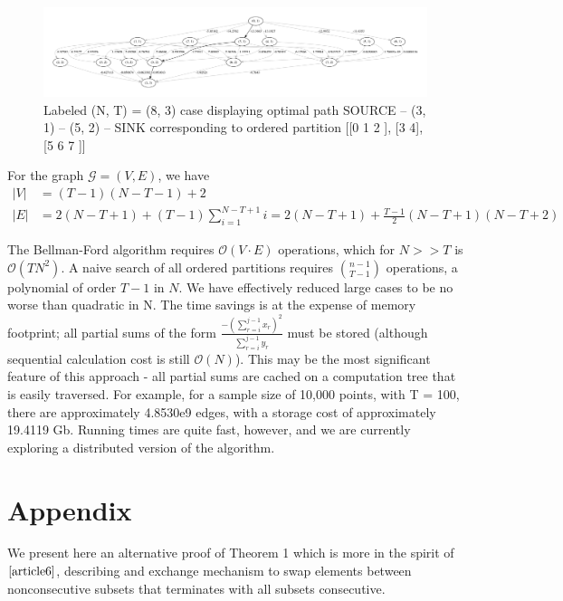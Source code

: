\documentclass{article}
\theoremstyle{case}
\begin{document}
% 

\vspace{16pt}
\begin{figure}
  \includegraphics[scale=.25]{8_3_labeled.pdf}
  \caption{Labeled (N, T) = (8, 3) case displaying optimal path SOURCE -- (3, 1) -- (5, 2) --  SINK corresponding to ordered partition [[0 1 2 ], [3 4], [5 6 7 ]]}
\end{figure}

For the graph $\mathcal{G} = \left( V, E\right)$, we have 
\begin{align*}
\vert V \vert & = \left( T-1\right)\left(N-T-1\right) + 2 \\
\vert E \vert & = 2\left( N-T+1\right) + \left( T-1\right)\sum_{i=1}^{N-T+1} i = 2\left( N-T+1\right) + \frac{T-1}{2}\left( N-T+1\right)\left( N-T+2\right)
\end{align*}

The Bellman-Ford algorithm requires $\mathcal{O}\left( V\cdot E\right)$ operations, which for $N >> T$ is $\mathcal{O}\left( TN^2\right)$. A naive search of all ordered partitions requires $\binom{n-1}{T-1}$ operations, a polynomial of order $T-1$ in $N$. We have effectively reduced large cases to be no worse than quadratic in N. The time savings is at the expense of memory footprint; all partial sums of the form $\frac{-\left(\sum_{r=i}^{j-1} x_r\right)^2}{\sum_{r=i}^{j-1} y_r}$ must be stored (although sequential calculation cost is still $\mathcal{O}\left( N\right)$). This may be the most significant feature of this approach - all partial sums are cached on a computation tree that is easily traversed. For example, for a sample size of 10,000 points, with T = 100, there are approximately 4.8530e9 edges, with a storage cost of approximately 19.4119 Gb. Running times are quite fast, however, and we are currently exploring a distributed version of the algorithm.

\cleardoublepage
\appendix
\section{Appendix}
We present here an alternative proof of Theorem 1 which is more in the spirit of $\cite{article6}$, describing and exchange mechanism to swap elements between nonconsecutive subsets that terminates with all subsets consecutive.
\end{document}
